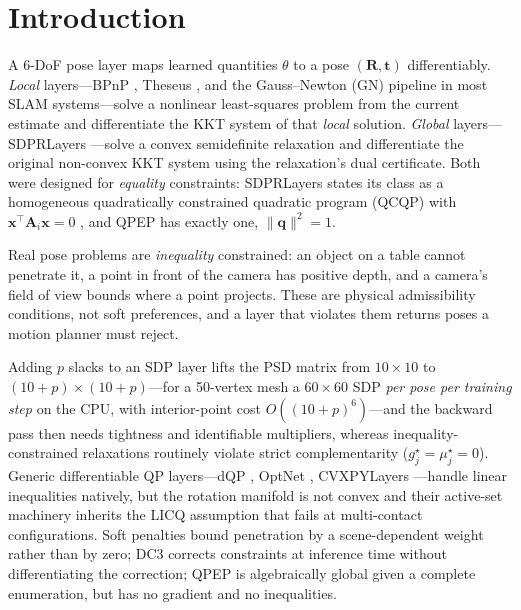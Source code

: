 \section{Introduction}\label{sec:intro}

A 6-DoF pose layer maps learned quantities $\theta$ to a pose $(\mathbf R,\mathbf t)$ differentiably. \emph{Local} layers---BPnP \cite{chen2020bpn}, Theseus \cite{pineda2022theseus}, and the Gauss--Newton (GN) pipeline in most SLAM systems---solve a nonlinear least-squares problem from the current estimate and differentiate the KKT system of that \emph{local} solution. \emph{Global} layers---SDPRLayers \cite{holmes2025sdpr}---solve a convex semidefinite relaxation and differentiate the original non-convex KKT system using the relaxation's dual certificate. Both were designed for \emph{equality} constraints: SDPRLayers states its class as a homogeneous quadratically constrained quadratic program (QCQP) with $\mathbf x^\top\mathbf A_i\mathbf x=0$ \cite{holmes2025sdpr}, and QPEP \cite{wu2022qpep} has exactly one, $\|\mathbf q\|^2=1$.

Real pose problems are \emph{inequality} constrained: an object on a table cannot penetrate it, a point in front of the camera has positive depth, and a camera's field of view bounds where a point projects. These are physical admissibility conditions, not soft preferences, and a layer that violates them returns poses a motion planner must reject.

Adding $p$ slacks to an SDP layer lifts the PSD matrix from $10\times10$ to $(10+p)\times(10+p)$---for a 50-vertex mesh a $60\times60$ SDP \emph{per pose per training step} on the CPU, with interior-point cost $O((10+p)^6)$---and the backward pass then needs tightness and identifiable multipliers, whereas inequality-constrained relaxations routinely violate strict complementarity ($g_j^\star=\mu_j^\star=0$). Generic differentiable QP layers---dQP \cite{magoon2025dqp}, OptNet \cite{amos2017optnet}, CVXPYLayers \cite{agrawal2019cvxpylayers}---handle linear inequalities natively, but the rotation manifold is not convex and their active-set machinery inherits the LICQ assumption that fails at multi-contact configurations. Soft penalties \cite{pineda2022theseus} bound penetration by a scene-dependent weight rather than by zero; DC3 \cite{donti2021dc3} corrects constraints at inference time without differentiating the correction; QPEP \cite{wu2022qpep} is algebraically global given a complete enumeration, but has no gradient and no inequalities.

